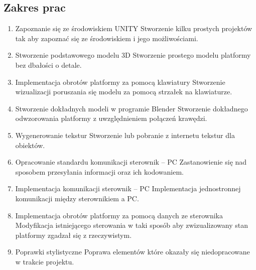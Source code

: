 \documentclass[10pt, a4paper]{article}
\begin{document}
	\subsection{Zakres prac}
		\begin{enumerate}
			\item Zapoznanie się ze środowiskiem UNITY
			\newline
			Stworzenie kilku prostych projektów tak aby zapoznać się ze środowiskiem i jego możliwościami.
			
			\item Stworzenie podstawowego modelu 3D
			\newline
			Stworzenie prostego modelu platformy bez dbałości o detale.
			
			\item Implementacja obrotów platformy za pomocą klawiatury
			\newline
			Stworzenie wizualizacji poruszania się modelu za pomocą strzałek na klawiaturze.
			
			\item Stworzenie dokładnych modeli w programie Blender
			\newline
			Stworzenie dokładnego odwzorowania platformy z uwzględnieniem połączeń krawędzi.
			
			\item Wygenerowanie tekstur
			\newline
			Stworzenie lub pobranie z internetu tekstur dla obiektów.
			
			\item Opracowanie standardu komunikacji sterownik -- PC
			\newline
			Zastanowienie się nad sposobem przesyłania informacji oraz ich kodowaniem.
			
			\item Implementacja komunikacji sterownik -- PC
			\newline
			Implementacja jednostronnej komunikacji między sterownikiem a PC.
			
			\item Implementacja obrotów platformy za pomocą danych ze sterownika
			\newline
			Modyfikacja istniejącego sterowania w taki sposób aby zwizualizowany stan platformy zgadzał się z rzeczywistym.
			
			\item Poprawki stylistyczne
			\newline
			Poprawa elementów które okazały się niedopracowane w trakcie projektu.
		\end{enumerate}
	
\end{document}

